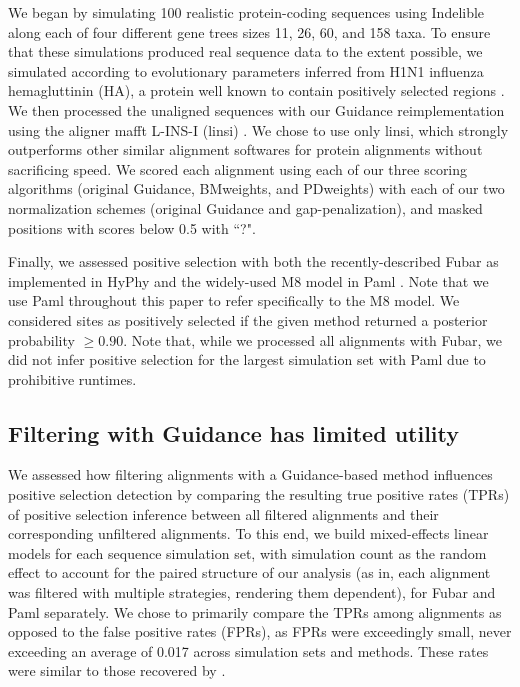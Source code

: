 \documentclass[10pt]{article}
\begin{document}
We began by simulating 100 realistic protein-coding sequences using Indelible \citep{Fletcher2009} along each of four different gene trees sizes 11, 26, 60, and 158 taxa. To ensure that these simulations produced real sequence data to the extent possible, we simulated according to evolutionary parameters inferred from H1N1 influenza hemagluttinin (HA), a protein well known to contain positively selected regions \citep{Meyer2012}. We then processed the unaligned sequences with our Guidance reimplementation using the aligner mafft L-INS-I (linsi) \citep{Katoh2005}. We chose to use only linsi, which strongly outperforms other similar alignment softwares for protein alignments \citep{Thompson2011,Nuin2006} without sacrificing speed. We scored each alignment using each of our three scoring algorithms (original Guidance, BMweights, and PDweights) with each of our two normalization schemes (original Guidance and gap-penalization), and masked positions with scores below 0.5 with ``?".

Finally, we assessed positive selection with both the recently-described Fubar \citep{Murrell2013} as implemented in HyPhy \citep{Pond2005} and the widely-used M8 model in Paml \citep{Yang2007}. Note that we use Paml throughout this paper to refer specifically to the M8 model. We considered sites as positively selected if the given method returned a posterior probability $\geq0.90$. Note that, while we processed all alignments with Fubar, we did not infer positive selection for the largest simulation set with Paml due to prohibitive runtimes. 


\subsection*{Filtering with Guidance has limited utility}

We assessed how filtering alignments with a Guidance-based method influences positive selection detection by comparing the resulting true positive rates (TPRs) of positive selection inference between all filtered alignments and their corresponding unfiltered alignments. To this end, we build mixed-effects linear models for each sequence simulation set, with simulation count as the random effect to account for the paired structure of our analysis (as in, each alignment was filtered with multiple strategies, rendering them dependent), for Fubar and Paml separately. We chose to primarily compare the TPRs among alignments as opposed to the false positive rates (FPRs), as FPRs were exceedingly small, never exceeding an average of 0.017 across simulation sets and methods. These rates were similar to those recovered by \citep{Jordan2011}. 
\end{document}
